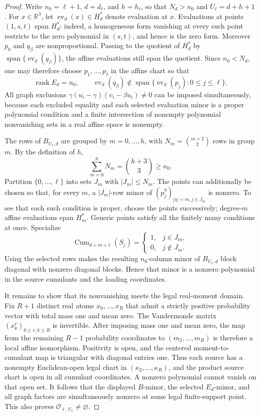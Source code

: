\documentclass{article}
\begin{document}
\begin{proof}
Write \(n_0=\ell+1\), \(d=d_\ell\), and \(h=h_\ell\), so that \(N_d>n_0\) and \(U_\ell=d+h+1\).  For \(x\in\mathbb R^3\), let \(\operatorname{ev}_d(x)\in H_d^*\) denote evaluation at \(x\).  Evaluations at points \((1,s,t)\) span \(H_d^*\): indeed, a homogeneous form vanishing at every such point restricts to the zero polynomial in \((s,t)\), and hence is the zero form.  Moreover \(p_0\) and \(q_\beta\) are nonproportional.  Passing to the quotient of \(H_d^*\) by \(\operatorname{span}\{\operatorname{ev}_d(q_\beta)\}\), the affine evaluations still span the quotient.  Since \(n_0<N_d\), one may therefore choose \(p_1,\ldots,p_\ell\) in the affine chart so that
\[
 \operatorname{rank}E_d=n_0,
 \qquad
 \operatorname{ev}_d(q_\beta)\notin
 \operatorname{span}\{\operatorname{ev}_d(p_j):0\le j\le\ell\}.
\]
All graph exclusions \(\gamma(u_i-\gamma)(v_i-\beta u_i)\ne0\) can be imposed simultaneously, because each excluded equality and each selected evaluation minor is a proper polynomial condition and a finite intersection of nonempty polynomial nonvanishing sets in a real affine space is nonempty.

The rows of \(B_{U_\ell,d}\) are grouped by \(m=0,\ldots,h\), with \(N_m=\binom{m+2}{2}\) rows in group \(m\).  By the definition of \(h\),
\[
 \sum_{m=0}^{h}N_m=\binom{h+3}{3}\ge n_0.
\]
Partition \(\{0,\ldots,\ell\}\) into sets \(J_m\) with \(|J_m|\le N_m\).  The points can additionally be chosen so that, for every \(m\), a \(|J_m|\)-row minor of \((p_j^\eta)_{|\eta|=m,j\in J_m}\) is nonzero.  To see that each such condition is proper, choose the points successively; degree-\(m\) affine evaluations span \(H_m^*\).  Generic points satisfy all the finitely many conditions at once.  Specialize
\[
 \operatorname{Cum}_{d+m+1}(S_j)=
 \begin{cases}1,&j\in J_m,\\0,&j\notin J_m.
 \end{cases}
\]
Using the selected rows makes the resulting \(n_0\)-column minor of \(B_{U_\ell,d}\) block diagonal with nonzero diagonal blocks.  Hence that minor is a nonzero polynomial in the source cumulants and the loading coordinates.

It remains to show that its nonvanishing meets the legal real-moment domain.  Fix \(R+1\) distinct real atoms \(x_0,\ldots,x_R\) that admit a strictly positive probability vector with total mass one and mean zero.  The Vandermonde matrix \((x_k^r)_{0\le r,k\le R}\) is invertible.  After imposing mass one and mean zero, the map from the remaining \(R-1\) probability coordinates to \((m_2,\ldots,m_R)\) is therefore a local affine isomorphism.  Positivity is open, and the centered moment-to-cumulant map is triangular with diagonal entries one.  Thus each source has a nonempty Euclidean-open legal chart in \((\kappa_2,\ldots,\kappa_R)\), and the product source chart is open in all cumulant coordinates.  A nonzero polynomial cannot vanish on that open set.  It follows that the displayed \(B\)-minor, the selected \(E_d\)-minor, and all graph factors are simultaneously nonzero at some legal finite-support point.  This also proves \(\mathcal O_{\ell,U_\ell}\ne\varnothing\).


\end{proof}
\end{document}
